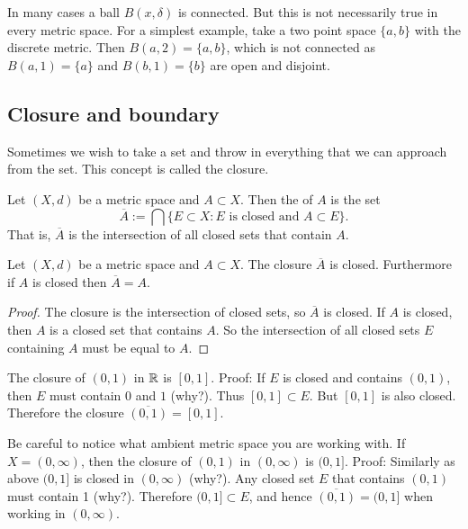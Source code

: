 \begin{example}
In many cases a ball $B(x,\delta)$ is connected.  But this is not
necessarily true in every metric space.
For a simplest example, take a two point space $\{ a,
b\}$ with the discrete metric.  Then $B(a,2) = \{ a , b \}$, which is not
connected as $B(a,1) = \{ a \}$ and 
$B(b,1) = \{ b \}$ are open and disjoint.
\end{example}

\subsection{Closure and boundary}

Sometimes we wish to take a set and throw in everything that we can approach
from the set.  This concept is called the closure.

\begin{defn}
Let $(X,d)$ be a metric space and $A \subset X$.  Then
the \emph{} of $A$ is the set
\begin{equation*}
\overline{A} := \bigcap \{ E \subset X : \text{$E$ is closed and $A \subset
E$} \} .
\end{equation*}
That is, $\overline{A}$ is the intersection of all closed sets that contain
$A$.
\end{defn}

\begin{prop}
Let $(X,d)$ be a metric space and $A \subset X$.  The closure $\overline{A}$
is closed.  Furthermore if $A$ is closed then $\overline{A} = A$.
\end{prop}

\begin{proof}
The closure is the intersection of closed sets, so $\overline{A}$ is closed.
If $A$ is closed, then $A$ is a closed set that contains $A$.
So the intersection of all closed sets $E$ containing $A$ must be equal to $A$.
\end{proof}

\begin{example}
The closure of $(0,1)$ in ${\mathbb{R}}$ is $[0,1]$.  Proof:  If
$E$ is closed and contains $(0,1)$, then $E$ must contain $0$ and $1$ (why?).
Thus $[0,1] \subset E$.  But $[0,1]$ is also closed.
Therefore the closure $\overline{(0,1)} = [0,1]$.
\end{example}

\begin{example}
Be careful to notice what ambient metric space you are working with.
If $X = (0,\infty)$, then
the closure of $(0,1)$ in $(0,\infty)$ is $(0,1]$.  Proof:  Similarly as
above $(0,1]$ is closed in $(0,\infty)$ (why?).  Any closed set $E$
that contains $(0,1)$ must contain 1 (why?).  Therefore $(0,1] \subset E$,
and hence $\overline{(0,1)} = (0,1]$ when working in $(0,\infty)$.
\end{example}

